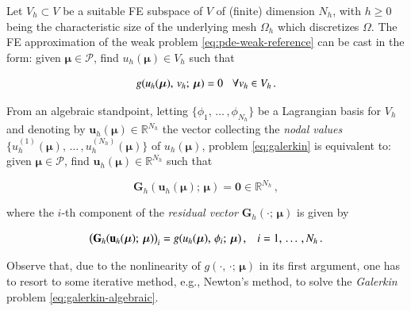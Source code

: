 \documentclass[longtitle]{elsarticle}
\numberwithin{equation}{section}
\theoremstyle{theorem}
\theoremstyle{definition}
\theoremstyle{remark}
\theoremstyle{proposition}
\numberwithin{figure}{section}
\newcommand{\bg}[1]{\boldsymbol{#1}}
\begin{document}
		Let $V_h \subset V$ be a suitable FE subspace of $V$ of (finite) dimension $N_h$, with $h \geq 0$ being the characteristic size of the underlying mesh $\Omega_h$ which discretizes $\Omega$. The FE approximation of the weak problem \eqref{eq:pde-weak-reference} can be cast in the form: given $\bg{\mu} \in \mathcal{P}$, find $u_h(\bg{\mu}) \in V_h$ such that 
		\begin{linenomath}\begin{linenomath}\begin{equation}
			\label{eq:galerkin}
			g(u_h(\bg{\mu}), \, v_h; \, \bg{\mu}) = 0 \hspace*{0.3cm} \forall v_h \in V_h \, .
		\end{equation}\end{linenomath}\end{linenomath}
		From an algebraic standpoint, letting $\big\lbrace \phi_1, \, \ldots \, , \phi_{N_h} \big\rbrace$ be a Lagrangian basis for $V_h$ and denoting by $\mathbf{u}_h(\bg{\mu}) \in \mathbb{R}^{N_h}$ the vector collecting the \emph{nodal values} $\big\lbrace u_h^{(1)}(\bg{\mu}), \, \ldots \, , u_h^{(N_h)}(\bg{\mu}) \big\rbrace$ of $u_h(\bg{\mu})$, problem \eqref{eq:galerkin} is equivalent to: given $\bg{\mu} \in \mathcal{P}$, find $\mathbf{u}_h(\bg{\mu}) \in \mathbb{R}^{N_h}$ such that
		\begin{linenomath}\begin{linenomath}\begin{equation}
			\label{eq:galerkin-algebraic}
			\mathbf{G}_h(\mathbf{u}_h(\bg{\mu}); \, \bg{\mu}) = \mathbf{0} \in \mathbb{R}^{N_h} \, ,
		\end{equation}\end{linenomath}\end{linenomath}
		where the $i$-th component of the \emph{residual vector} $\mathbf{G}_h(\cdot; \, \bg{\mu})$ is given by
		\begin{linenomath}\begin{linenomath}\begin{equation}
			\label{eq:galerkin-algebraic-component}
			\big( \mathbf{G}_h(\mathbf{u}_h(\bg{\mu}); \, \bg{\mu}) \big)_i = g(u_h(\bg{\mu}), \, \phi_i; \, \bg{\mu}) \, , \hspace*{0.3cm} i = 1, \, \ldots \, , N_h \, .
		\end{equation}\end{linenomath}\end{linenomath}
		Observe that, due to the nonlinearity of $g(\cdot, \, \cdot; \, \bg{\mu})$ in its first argument, one has to resort to some iterative method, e.g., Newton's method, to solve the \emph{Galerkin} problem \eqref{eq:galerkin-algebraic}. 		
		
\end{document}
